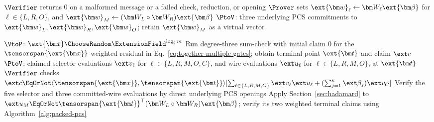 \begin{algorithm}[!t]
\footnotesize
\linespread{0.97}\selectfont
\caption{PLONK proof with packing across instances}
\label{alg:multiple-instance-packing}

\(\Verifier\) returns \(0\) on a malformed message or a failed
check, reduction, or opening\;
\(\Prover\) sets
\(\ext{\bm w}_\ell\leftarrow\bm W_\ell\ext{\bm\beta}\)
for \(\ell\in\{L,R,O\}\), and
\(\ext{\bm w}_M\leftarrow
(\bm W_L\circ\bm W_R)\ext{\bm\beta}\)\;
\(\PtoV\): three underlying PCS commitments to
\(\ext{\bm w}_L,\ext{\bm w}_R,\ext{\bm w}_O\);
retain \(\ext{\bm w}_M\) as a virtual vector\;

\(\VtoP\): \(\ext{\bm x}\ChooseRandom
\ExtensionField^{\log_2m}\)\;
Run degree-three sum-check with initial claim \(0\) for the
\(\tensorspan{\ext{\bm x}}\)-weighted residual in
Eq.~\eqref{eq:together-multiple-gates};
obtain terminal point \(\ext{\bm t}\) and claim \(\ext c\)\;
\(\PtoV\): claimed selector evaluations \(\ext v_\ell\)
for \(\ell\in\{L,R,M,O,C\}\), and wire evaluations
\(\ext u_\ell\) for \(\ell\in\{L,R,M,O\}\), at \(\ext{\bm t}\)\;
\(\Verifier\) checks
\(\ext c\EqOrNot
\langle\tensorspan{\ext{\bm x}},\tensorspan{\ext{\bm t}}\rangle
[\sum_{\ell\in\{L,R,M,O\}}\ext v_\ell\ext u_\ell+
(\sum_{j=1}^{\kappa}\ext\beta_j)\ext v_C]\)\;
Verify the five selector and three committed-wire evaluations
by direct underlying PCS openings\;
Apply Section~\ref{sec:hadamard}
to
\(\ext u_M\EqOrNot
\tensorspan{\ext{\bm t}}^\top
(\bm W_L\circ\bm W_R)\ext{\bm\beta}\);
verify its two weighted terminal claims using
Algorithm~\ref{alg:packed-pcs}\;


\end{algorithm}
